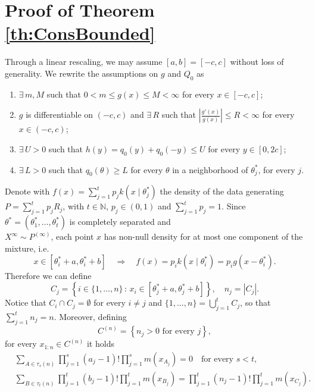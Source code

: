 \documentclass[12pt]{article}
\begin{document}
\section{Proof of Theorem \ref{th:ConsBounded}}

Through a linear rescaling, we may assume $[a, b] = [-c, c]$ without loss of generality.  We rewrite the assumptions on $g$ and $Q_0$ as
\begin{enumerate}
\item[$T1.$]  $\exists \, m, M$ such that $0 < m \leq g(x) \leq M < \infty$ for every $x \in [-c, c]$;
\item[$T2.$]  $g$ is differentiable on $(-c, c)$ and $\exists \, R$ such that $|\frac{g'(x)}{g(x)}| \leq R < \infty$ for every $x \in (-c, c)$;
\item[$T3.$]  $\exists \, U > 0$ such that $h(y) = q_0(y)+q_0(-y) \leq U$ for every $y \in [0, 2c]$;
\item[$T4.$]  $\exists \, L > 0$ such that $q_0(\theta) \geq L$ for every $\theta$ in a neighborhood of $\theta_j^*$, for every $j$.
\end{enumerate}
Denote with $f(x) = \sum_{j = 1}^tp_jk(x \mid \theta_j^*)$ the density of the data generating $P = \sum_{j = 1}^tp_jR_j$, with $t \in \mathbb{N}$, $p_j \in (0,1)$ and $\sum_{j = 1}^tp_j = 1$. Since $\theta^* =(\theta_1^*, \dots, \theta_t^*)$ is completely separated and \\$X^{\infty} \sim P^{(\infty)}$, each point $x$ has non-null density for at most one component of the mixture, i.e.
\[
x \in [\theta_i^*+a, \theta_i^*+b] \quad \Rightarrow \quad f(x) = p_ik(x \mid \theta_i^*) = p_ig(x-\theta_i^*).
\]
Therefore we can define
\[
C_j = \left\{ i \in \{1, \dots, n\} \, : \, x_i \in [\theta_j^*+a, \theta_j^*+b] \right\}, \quad n_j = |C_j|.
\]
Notice that $C_i \cap C_j = \emptyset$ for every $i \neq j$ and $\{1, \dots, n \} = \bigcup_{j = 1}^tC_j$, so that $\sum_{j = 1}^t n_j = n$. Moreover, defining
\[
C^{(n)} = \left\{ n_j > 0 \text{ for every $j$} \right\},
\]
for every $x_{1:n} \in C^{(n)}$ it holds
\begin{equation}\label{less_and_equal}
\begin{aligned}
&\sum_{A \in \tau_s(n)}\prod_{j=1}^s(a_j-1)!\prod_{j=1}^s m(x_{A_j}) = 0 \quad \text{for every } s < t,\\
&\sum_{B \in \tau_t(n)}\prod_{j=1}^t(b_j-1)!\prod_{j=1}^t m(x_{B_j}) = \prod_{j = 1}^t(n_j-1)!\prod_{j = 1}^tm(x_{C_j}).
\end{aligned}
\end{equation}
\end{document}
